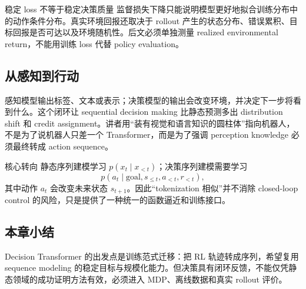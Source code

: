 
\begin{warningbox}{稳定 loss 不等于稳定决策质量}
监督损失下降只能说明模型更好地拟合训练分布中的动作条件分布。真实环境回报还取决于 rollout 产生的状态分布、错误累积、目标回报是否可达以及环境随机性。后文必须单独测量 realized environmental return，不能用训练 loss 代替 policy evaluation。
\end{warningbox}

\subsection{从感知到行动}

感知模型输出标签、文本或表示；决策模型的输出会改变环境，并决定下一步将看到什么。这个闭环让 sequential decision making 比静态预测多出 distribution shift 和 credit assignment。讲者用“装有视觉和语言知识的圆柱体”指向机器人，不是为了说机器人只差一个 Transformer，而是为了强调 perception knowledge 必须最终转成 action sequence。


\begin{importantbox}{核心转向}
静态序列建模学习 $p(x_t\mid x_{<t})$；决策序列建模需要学习
\[
p(a_t\mid \text{goal},s_{\le t},a_{<t},r_{<t}),
\]
其中动作 $a_t$ 会改变未来状态 $s_{t+1}$。因此“tokenization 相似”并不消除 closed-loop control 的风险，只是提供了一种统一的函数逼近和训练接口。
\end{importantbox}

\subsection{本章小结}

Decision Transformer 的出发点是训练范式迁移：把 RL 轨迹转成序列，希望复用 sequence modeling 的稳定目标与规模化能力。但决策具有闭环反馈，不能仅凭静态领域的成功证明方法有效，必须进入 MDP、离线数据和真实 rollout 评价。

